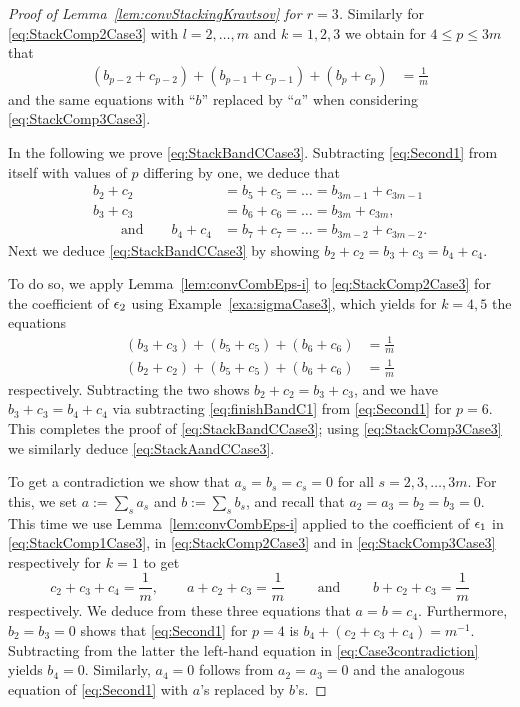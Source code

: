 \begin{proof}[Proof of Lemma~\ref{lem:convStackingKravtsov} for $r=3$]
	
	Similarly for \eqref{eq:StackComp2Case3} with $l=2,\ldots,m$ and $k=1,2,3$ we obtain for $4 \leq p \leq 3m$ that
	\begin{align}
		(b_{p-2} + c_{p-2})  + (b_{p-1} + c_{p-1}) + (b_{p} + c_p)  &= \frac{1}{m} \label{eq:Second1} 
	\end{align}
	and the same equations with ``$b$'' replaced by ``$a$'' when considering \eqref{eq:StackComp3Case3}.
	
	In the following we prove \eqref{eq:StackBandCCase3}. Subtracting \eqref{eq:Second1} from itself with values of $p$ differing by one, we deduce that 
	\begin{align*}
		b_{2} + c_2 &= b_5 + c_5 = \ldots = b_{3m-1} + c_{3m-1}\\
		b_3 + c_3 &= b_6 + c_6 = \ldots = b_{3m} + c_{3m}, \\
		\qquad \text{and} \qquad b_4 + c_4 &= b_7 + c_7 = \ldots = b_{3m-2} + c_{3m-2}.
	\end{align*}
	Next we deduce \eqref{eq:StackBandCCase3} by showing $b_2 + c_2 = b_3 + c_3 = b_4 + c_4$. 
	
	To do so, we apply Lemma~\ref{lem:convCombEps-i} to \eqref{eq:StackComp2Case3} for the coefficient of $\epsilon_2$ using Example~\ref{exa:sigmaCase3}, which yields for $k=4,5$ the equations
	\begin{align}
		(b_3 + c_3) + (b_5 + c_5) + (b_6 + c_6)  &= \frac{1}{m}  \label{eq:finishBandC1}\\
		(b_2 + c_2) + (b_5 + c_5) + (b_6  + c_6)  &= \frac{1}{m} \label{eq:finishBandC2}
	\end{align}
	respectively. Subtracting the two shows $b_2 + c_2  = b_3 + c_3$, and we have $b_3 + c_3  = b_4 + c_4$ via subtracting \eqref{eq:finishBandC1} from \eqref{eq:Second1} for $p=6$. This completes the proof of \eqref{eq:StackBandCCase3}; using \eqref{eq:StackComp3Case3} we similarly deduce \eqref{eq:StackAandCCase3}.
	
	To get a contradiction we show that $a_s = b_s = c_s = 0$ for all $s = 2,3,\ldots, 3 m$. For this, we set $a := \sum_{s} a_s$ and $b := \sum_s b_s$, and recall that $a_2 = a_3 = b_2 = b_3 = 0$. This time we use Lemma~\ref{lem:convCombEps-i} applied to the coefficient of $\epsilon_1$ in \eqref{eq:StackComp1Case3}, in \eqref{eq:StackComp2Case3} and in \eqref{eq:StackComp3Case3} respectively for $k=1$ to get
	\begin{equation}\label{eq:Case3contradiction}
		c_2 + c_3 + c_4 = \frac{1}{m}, \qquad
		a + c_2 + c_3 = \frac{1}{m}  \qquad \text{ and } \qquad
		b + c_2 + c_3 = \frac{1}{m}
	\end{equation}
	respectively. We deduce from these three equations that $a = b = c_4$. Furthermore, $b_2 = b_3 = 0$ shows that \eqref{eq:Second1} for $p=4$ is $b_4 + (c_2 + c_3 + c_4) = m^{-1}$. Subtracting from the latter the left-hand equation in \eqref{eq:Case3contradiction} yields $b_4 = 0$. Similarly, $a_4 = 0$ follows from $a_2 = a_3 = 0$ and the analogous equation of \eqref{eq:Second1} with $a$'s replaced by $b$'s.
	

\end{proof}
